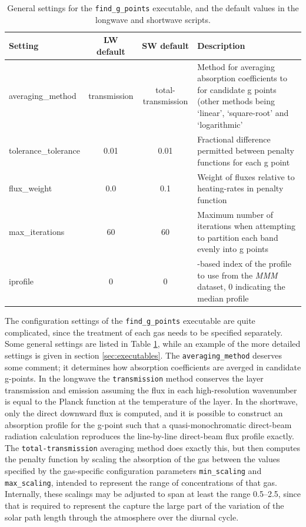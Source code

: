 \documentclass[a4,oneside]{article}
\def\codesize{\small}
\def\codesize{\small}
\def\code#1{{\codesize\texttt{#1}}}
\begin{document}
\begin{table}[tb!]
\caption{\label{tab:find_g_points}General settings for the
  \code{find\_g\_points} executable, and the default values in the
  longwave and shortwave scripts.}
\begin{center}
\begin{tabular}{lcc>{\raggedright\arraybackslash}p{7cm}}
\hline
Setting & LW default & SW default & Description\\
\hline
averaging\_method & transmission & total-transmission & Method for averaging absorption coefficients to for candidate g points (other methods being `linear', `square-root' and `logarithmic' \\
tolerance\_tolerance & 0.01 & 0.01 & Fractional difference permitted between penalty functions for each g point \\
flux\_weight & 0.0 & 0.1 & Weight of fluxes relative to heating-rates in penalty function \\
max\_iterations & 60 & 60 & Maximum number of iterations when attempting to partition each band evenly into g points\\
iprofile & 0 & 0 & 0-based index of the profile to use from the \emph{MMM} dataset, 0 indicating the median profile\\
\hline
\end{tabular}
\end{center}
\end{table}

The configuration settings of the \code{find\_g\_points} executable
are quite complicated, since the treatment of each gas needs to be
specified separately. Some general settings are listed in Table
\ref{tab:find_g_points}, while an example of the more detailed
settings is given in section \ref{sec:executables}. The
\code{averaging\_method} deserves some comment; it determines how
absorption coefficients are averged in candidate g-points.  In the
longwave the \code{transmission} method conserves the layer
transmission and emission assuming the flux in each high-resolution
wavenumber is equal to the Planck function at the temperature of the
layer. In the shortwave, only the direct downward flux is computed,
and it is possible to construct an absorption profile for the g-point
such that a quasi-monochromatic direct-beam radiation calculation
reproduces the line-by-line direct-beam flux profile exactly. The
\code{total-transmission} averaging method does exactly this, but then
computes the penalty function by scaling the absorption of the gas
between the values specified by the gas-specific configuration
parameters \code{min\_scaling} and \code{max\_scaling}, intended to
represent the range of concentrations of that gas. Internally, these
scalings may be adjusted to span at least the range 0.5--2.5, since
that is required to represent the capture the large part of the
variation of the solar path length through the atmosphere over the
diurnal cycle.
\end{document}
